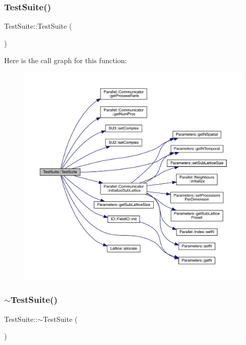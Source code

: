 \subsubsection{\texorpdfstring{TestSuite()}{TestSuite()}}
{\footnotesize\ttfamily Test\+Suite\+::\+Test\+Suite (\begin{DoxyParamCaption}{ }\end{DoxyParamCaption})}

Here is the call graph for this function\+:\nopagebreak
\begin{figure}[H]
\begin{center}
\leavevmode
\includegraphics[width=350pt]{class_test_suite_af7291e6d8b53443604ee0c1fcf1fadfc_cgraph}
\end{center}
\end{figure}
\mbox{\label{class_test_suite_a1a4603e985169c62d251876dd3910b5e}} 
\subsubsection{\texorpdfstring{$\sim$TestSuite()}{~TestSuite()}}
{\footnotesize\ttfamily Test\+Suite\+::$\sim$\+Test\+Suite (\begin{DoxyParamCaption}{ }\end{DoxyParamCaption})}



